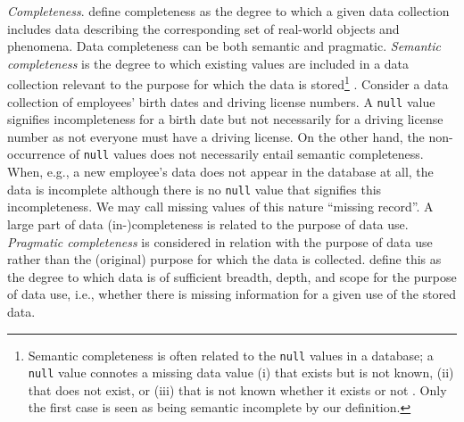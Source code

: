 \textit{Completeness}. 
\citet{Wand1996, Batini2009} define completeness as the degree to which a given data collection includes data describing the corresponding set of real-world objects and phenomena.
Data completeness can be both semantic and pragmatic. 
\textit{Semantic completeness} is the degree to which existing values are included in a data collection relevant to the purpose for which the data is stored\footnote{Semantic completeness is often related to the \texttt{null} values in a database; a \texttt{null} value connotes a missing data value  (i) that exists but is not known, (ii) that does not exist, or (iii) that is not known whether it exists or not \citep{Redman1996,Price2005,Batini2009}. Only the first case is seen as being semantic incomplete by our definition.} \citep{Redman1996,Bovee2003,Price2005}.  
%
Consider a data collection of employees' birth dates and driving license numbers. 
A \texttt{null} value signifies incompleteness for a birth date but not necessarily for a driving license number as not everyone must have a driving license. 
On the other hand, the non-occurrence of \texttt{null} values does not necessarily entail semantic completeness.
When, e.g., a new employee's data does not appear in the database at all, the data is incomplete although there is no \texttt{null} value that signifies this incompleteness. We may call missing values of this nature ``missing record''. 
%
A large part of data (in-)completeness is related to the purpose of data use.  \textit{Pragmatic completeness}  is considered in relation with the purpose of data use rather than the (original) purpose for which the data is collected.  \citet{Wang1996} define this as the degree to which data is of sufficient breadth, depth, and scope for the purpose of data use, i.e., whether there is missing information for a given use of the stored data. 

